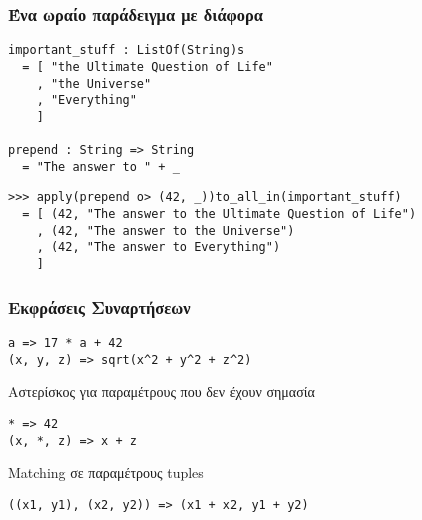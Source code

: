 \documentclass{beamer}
\def\e{\foreignlanguage{english}}
\begin{document}
\begin{frame}[fragile]

\frametitle{Ένα ωραίο παράδειγμα με διάφορα}


\begin{otherlanguage}{english}
\begin{verbatim}
important_stuff : ListOf(String)s
  = [ "the Ultimate Question of Life"
    , "the Universe"
    , "Everything"
    ]

prepend : String => String
  = "The answer to " + _
\end{verbatim}

\pause
\begin{verbatim}
>>> apply(prepend o> (42, _))to_all_in(important_stuff)
  = [ (42, "The answer to the Ultimate Question of Life")
    , (42, "The answer to the Universe")
    , (42, "The answer to Everything")
    ]
\end{verbatim}
\end{otherlanguage}

\end{frame}

\begin{frame}[fragile]

\frametitle{Εκφράσεις Συναρτήσεων}

\begin{otherlanguage}{english}
\begin{verbatim}
a => 17 * a + 42
(x, y, z) => sqrt(x^2 + y^2 + z^2)
\end{verbatim}
\end{otherlanguage}

\pause
Αστερίσκος για παραμέτρους που δεν έχουν σημασία
\begin{otherlanguage}{english}
\begin{verbatim}
* => 42
(x, *, z) => x + z
\end{verbatim}
\end{otherlanguage}

\pause
\e{Matching} σε παραμέτρους \e{tuples}
\begin{otherlanguage}{english}
\begin{verbatim}
((x1, y1), (x2, y2)) => (x1 + x2, y1 + y2)
\end{verbatim}
\end{otherlanguage}

\end{frame}
\end{document}
